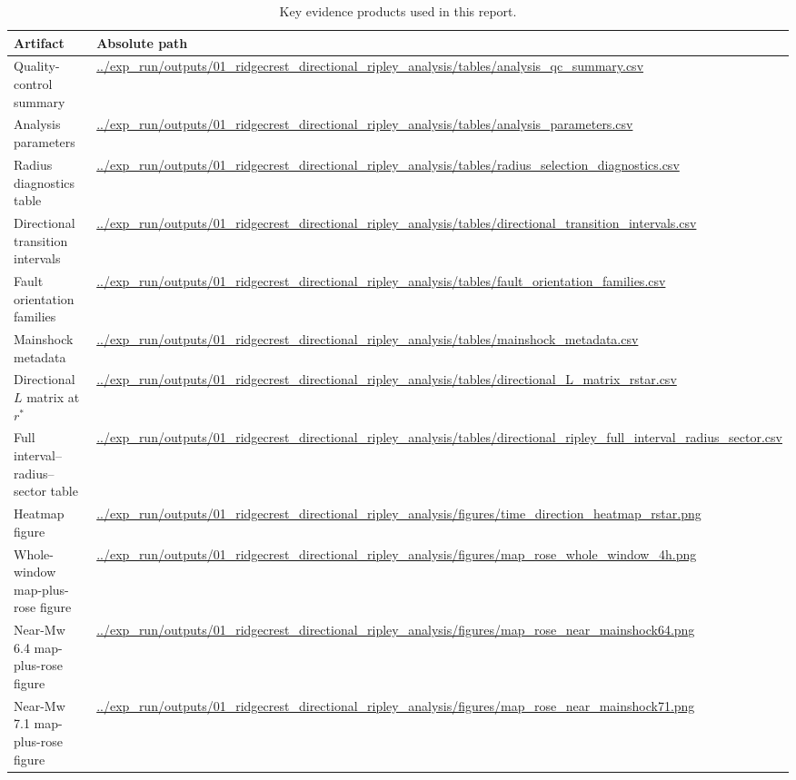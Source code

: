 \documentclass[11pt]{article}
\begin{document}
\begin{table}[H]
\centering
\caption{Key evidence products used in this report.}
\label{tab:outputs}
\begin{tabularx}{\textwidth}{@{}l>{\raggedright\arraybackslash}X@{}}
\toprule
Artifact & Absolute path \\
\midrule
Quality-control summary & \url{../exp_run/outputs/01_ridgecrest_directional_ripley_analysis/tables/analysis_qc_summary.csv} \\
Analysis parameters & \url{../exp_run/outputs/01_ridgecrest_directional_ripley_analysis/tables/analysis_parameters.csv} \\
Radius diagnostics table & \url{../exp_run/outputs/01_ridgecrest_directional_ripley_analysis/tables/radius_selection_diagnostics.csv} \\
Directional transition intervals & \url{../exp_run/outputs/01_ridgecrest_directional_ripley_analysis/tables/directional_transition_intervals.csv} \\
Fault orientation families & \url{../exp_run/outputs/01_ridgecrest_directional_ripley_analysis/tables/fault_orientation_families.csv} \\
Mainshock metadata & \url{../exp_run/outputs/01_ridgecrest_directional_ripley_analysis/tables/mainshock_metadata.csv} \\
Directional $L$ matrix at $r^{\ast}$ & \url{../exp_run/outputs/01_ridgecrest_directional_ripley_analysis/tables/directional_L_matrix_rstar.csv} \\
Full interval--radius--sector table & \url{../exp_run/outputs/01_ridgecrest_directional_ripley_analysis/tables/directional_ripley_full_interval_radius_sector.csv} \\
Heatmap figure & \url{../exp_run/outputs/01_ridgecrest_directional_ripley_analysis/figures/time_direction_heatmap_rstar.png} \\
Whole-window map-plus-rose figure & \url{../exp_run/outputs/01_ridgecrest_directional_ripley_analysis/figures/map_rose_whole_window_4h.png} \\
Near-Mw 6.4 map-plus-rose figure & \url{../exp_run/outputs/01_ridgecrest_directional_ripley_analysis/figures/map_rose_near_mainshock64.png} \\
Near-Mw 7.1 map-plus-rose figure & \url{../exp_run/outputs/01_ridgecrest_directional_ripley_analysis/figures/map_rose_near_mainshock71.png} \\
\bottomrule
\end{tabularx}
\end{table}
\end{document}
